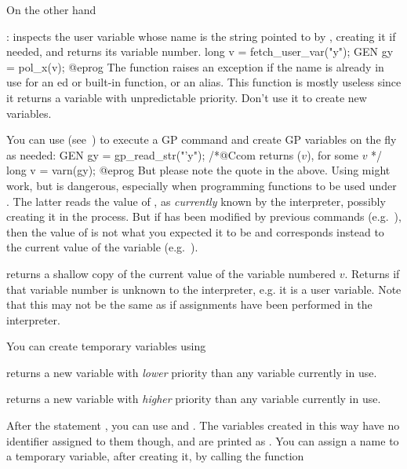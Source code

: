 On the other hand

: inspects the user variable whose name is
the string pointed to by , creating it if needed, and returns its
variable number.
\bprog
long v = fetch_user_var("y");
GEN gy = pol_x(v);
@eprog\noindent
The function raises an exception if the name is already in use for an
ed or built-in function, or an alias. This function
is mostly useless since it returns a variable with unpredictable priority.
Don't use it to create new variables.

 You can use 
(see~) to execute a GP command and create GP
variables on the fly as needed:
\bprog
GEN gy = gp_read_str("'y"); /*@Ccom returns ($v$), for some $v$ */
long v = varn(gy);
@eprog\noindent
But please note the quote  in the above. Using 
might work, but is dangerous, especially when programming functions to
be used under . The latter reads the value of , as
\emph{currently} known by the  interpreter, possibly creating it
in the process. But if  has been modified by previous 
commands (e.g.~), then the value of  is not what you
expected it to be and corresponds instead to the current value of the
 variable (e.g.~).

 returns a shallow copy of the current
value of the variable numbered $v$. Returns  if that variable
number is unknown to the interpreter,  e.g. it is a user variable. Note
that this may not be the same as  if assignments have been
performed in the interpreter.

You can create temporary variables using

returns a new variable with \emph{lower} priority than any variable currently
in use.

returns a new variable with \emph{higher} priority than any variable
currently in use.

\noindent
After the statement , you can use
 and . The variables created in this way have no
identifier assigned to them though, and are printed as
. You can assign a name to a temporary variable, after
creating it, by calling the function

